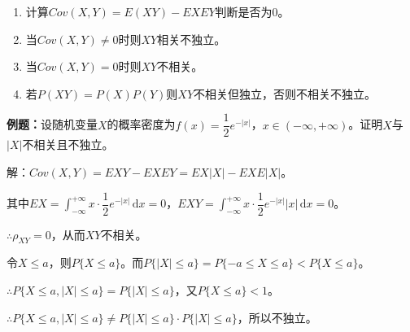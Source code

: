 \documentclass[UTF8, 12pt]{ctexart}
\begin{document}
\begin{enumerate}
    \item 计算$Cov(X,Y)=E(XY)-EXEY$判断是否为0。
    \item 当$Cov(X,Y)\neq0$时则$XY$相关不独立。
    \item 当$Cov(X,Y)=0$时则$XY$不相关。
    \item 若$P(XY)=P(X)P(Y)$则$XY$不相关但独立，否则不相关不独立。
\end{enumerate}

\textbf{例题：}设随机变量$X$的概率密度为$f(x)=\dfrac{1}{2}e^{-\vert x\vert}$，$x\in(-\infty,+\infty)$。证明$X$与$\vert X\vert$不相关且不独立。

解：$Cov(X,Y)=EXY-EXEY=EX\vert X\vert-EXE\vert X\vert$。

其中$EX=\displaystyle{\int_{-\infty}^{+\infty}}x\cdot\dfrac{1}{2}e^{-\vert x\vert}\,\textrm{d}x=0$，$EXY=\displaystyle{\int_{-\infty}^{+\infty}}x\cdot\dfrac{1}{2}e^{-\vert x\vert}\vert x\vert\,\textrm{d}x=0$。

$\therefore\rho_{XY}=0$，从而$XY$不相关。

令$X\leqslant a$，则$P\{X\leqslant a\}$。而$P\{\vert X\vert\leqslant a\}=P\{-a\leqslant X\leqslant a\}<P\{X\leqslant a\}$。

$\therefore P\{X\leqslant a,\vert X\vert\leqslant a\}=P\{\vert X\vert\leqslant a\}$，又$P\{X\leqslant a\}<1$。

$\therefore P\{X\leqslant a,\vert X\vert\leqslant a\}\neq P\{\vert X\vert\leqslant a\}\cdot P\{\vert X\vert\leqslant a\}$，所以不独立。
\end{document}
